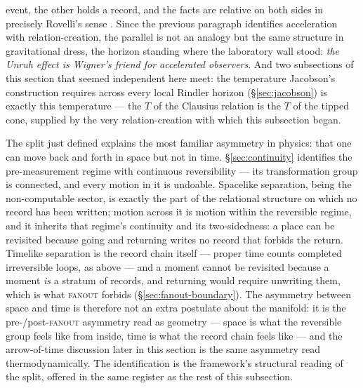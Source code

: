 event, the other holds a record, and the facts are relative on both sides in precisely Rovelli's
sense \autocite{DiBiagioRovelli2021}. Since the previous paragraph identifies acceleration with
relation-creation, the parallel is not an analogy but the same structure in gravitational dress, the
horizon standing where the laboratory wall stood: \emph{the Unruh effect is Wigner's friend for
accelerated observers}. And two subsections of this section that seemed independent here meet: the
temperature Jacobson's construction requires across every local Rindler horizon
(\S\ref{sec:jacobson}) is exactly this temperature --- the $T$ of the Clausius relation is the $T$
of the tipped cone, supplied by the very relation-creation with which this subsection began.


The split just defined explains the most familiar asymmetry in physics: that one can move back and
forth in space but not in time. \S\ref{sec:continuity} identifies the pre-measurement regime with
continuous reversibility --- its transformation group is connected, and every motion in it is
undoable. Spacelike separation, being the non-computable sector, is exactly the part of the
relational structure on which no record has been written; motion across it is motion within the
reversible regime, and it inherits that regime's continuity and its two-sidedness: a place can be
revisited because going and returning writes no record that forbids the return. Timelike separation
is the record chain itself --- proper time counts completed irreversible loops, as above --- and a
moment cannot be revisited because a moment \emph{is} a stratum of records, and returning would
require unwriting them, which is what \textsc{fanout} forbids (\S\ref{sec:fanout-boundary}). The
asymmetry between space and time is therefore not an extra postulate about the manifold: it is the
pre-/post-\textsc{fanout} asymmetry read as geometry --- space is what the reversible group feels
like from inside, time is what the record chain feels like --- and the arrow-of-time discussion
later in this section is the same asymmetry read thermodynamically. The identification is the
framework's structural reading of the split, offered in the same register as the rest of this
subsection.

